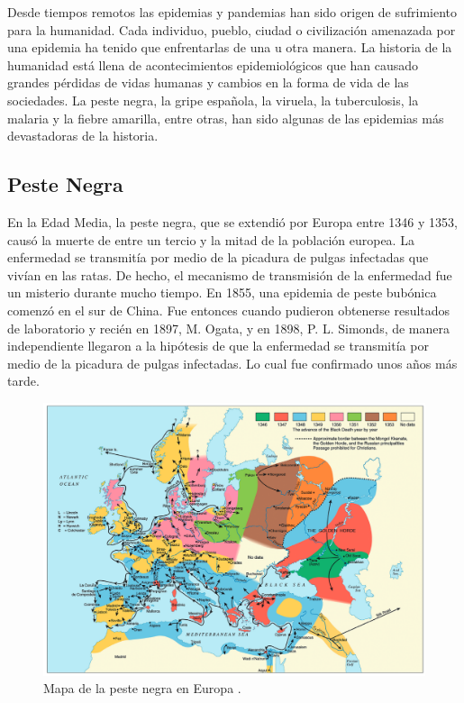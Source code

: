 \graphicspath{{figs/cap2}}


Desde tiempos remotos las epidemias y pandemias han sido origen de sufrimiento para la humanidad. Cada individuo, pueblo, ciudad o civilización amenazada por una epidemia ha tenido 
que enfrentarlas de una u otra manera. La historia de la humanidad está llena de acontecimientos epidemiológicos que han causado grandes pérdidas de vidas humanas y cambios en la 
forma de vida de las sociedades. La peste negra, la gripe española, la viruela, la tuberculosis, la malaria  y la fiebre amarilla,
entre otras, han sido algunas de las epidemias más devastadoras de la historia. 

\subsection*{Peste Negra}

En la Edad Media, la peste negra, que se extendió por Europa entre 1346 y 1353, causó la muerte de entre un tercio y la mitad de la población europea. La enfermedad 
se transmitía por medio de la picadura de pulgas infectadas que vivían en las ratas. De hecho, el mecanismo de transmisión de la enfermedad fue un misterio durante mucho tiempo.
En 1855, una epidemia de peste bubónica comenzó en el sur de China. Fue entonces cuando pudieron obtenerse resultados de laboratorio y recién en 1897, M. Ogata, y en 1898,
P. L. Simonds, de manera independiente llegaron a la hipótesis de que la enfermedad se transmitía por medio de la picadura de pulgas infectadas. Lo cual fue confirmado unos 
años más tarde. 


\begin{figure}[h]
    \centering
    \includegraphics[width=\imsizeL]{Black_Death.png}
    \caption[Mapa de la peste negra en Europa.]{Mapa de la peste negra en Europa \cite{black_death}.}
    \label{fig:Black_Death}
\end{figure}

